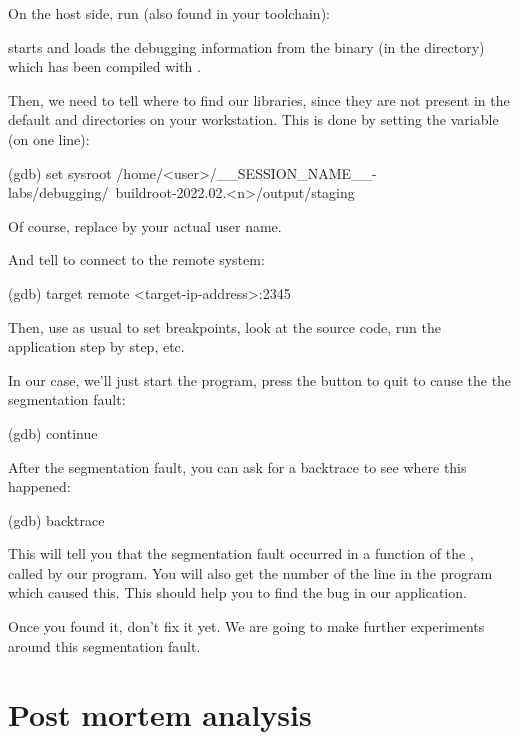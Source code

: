 
On the host side, run  (also found in your toolchain):

 starts and loads the debugging information from the
 binary (in the  directory)
which has been compiled with .

Then, we need to tell where to find our libraries, since they are not
present in the default  and  directories on
your workstation. This is done by setting the  
variable (on one line):

\begin{bashinput}
(gdb) set sysroot /home/<user>/__SESSION_NAME__-labs/debugging/\
    buildroot-2022.02.<n>/output/staging
\end{bashinput}

Of course, replace  by your actual user name.

And tell  to connect to the remote system:
\begin{bashinput}
(gdb) target remote <target-ip-address>:2345
\end{bashinput}

Then, use  as usual to set breakpoints, look at the source
code, run the application step by step, etc.

In our case, we'll just start the program, press the  button
to quit to cause the the segmentation fault:
\begin{bashinput}
(gdb) continue
\end{bashinput}

After the segmentation fault, you can ask for a backtrace to see
where this happened:
\begin{bashinput}
(gdb) backtrace
\end{bashinput}

This will tell you that the segmentation fault occurred in a function
of the \code{libmpdclient}, called by our program. You will also get
the number of the line in the program which caused this. This should
help you to find the bug in our application.

Once you found it, don't fix it yet. We are going to make further
experiments around this segmentation fault.

\section{Post mortem analysis}

